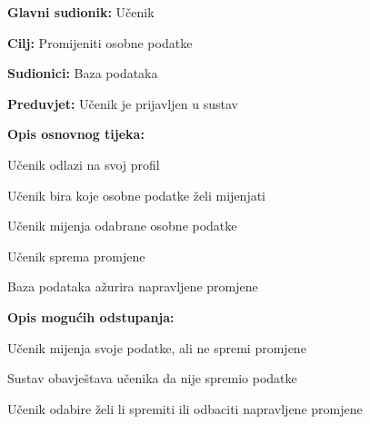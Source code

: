 					\noindent {}
					\begin{packed_item}
	
						\item \textbf{Glavni sudionik: }Učenik
						\item  \textbf{Cilj:} Promijeniti osobne podatke
						\item  \textbf{Sudionici:} Baza podataka
						\item  \textbf{Preduvjet:} Učenik je prijavljen u sustav
						\item  \textbf{Opis osnovnog tijeka:}
						
						\item[] \begin{packed_enum}
	
							\item Učenik odlazi na svoj profil
							\item Učenik bira koje osobne podatke želi mijenjati
							\item Učenik mijenja odabrane osobne podatke
							\item Učenik sprema promjene
							\item Baza podataka ažurira napravljene promjene
						\end{packed_enum}
						
						\item  \textbf{Opis mogućih odstupanja:}
						
						\item[] \begin{packed_item}
	
							\item[4.a] Učenik mijenja svoje podatke, ali ne spremi promjene
							\item[] \begin{packed_enum}
								
								\item Sustav obavještava učenika da nije spremio podatke
								\item Učenik odabire želi li spremiti ili odbaciti napravljene promjene 
								
							\end{packed_enum}
							
						\end{packed_item}
					\end{packed_item}

